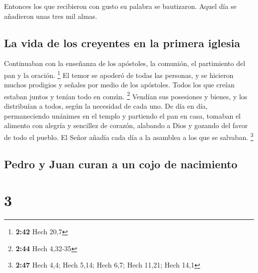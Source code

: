 Entonces los que recibieron con gusto su palabra se
bautizaron. Aquel día se añadieron unas tres mil almas.

\hypertarget{la-vida-de-los-creyentes-en-la-primera-iglesia}{%
\subsection{La vida de los creyentes en la primera
iglesia}\label{la-vida-de-los-creyentes-en-la-primera-iglesia}}

 Continuaban con la enseñanza de los apóstoles, la
comunión, el partimiento del pan y la oración. \footnote{\textbf{2:42}
  Hech 20,7}  El temor se apoderó de todas las personas,
y se hicieron muchos prodigios y señales por medio de los apóstoles.
 Todos los que creían estaban juntos y tenían todo en
común. \footnote{\textbf{2:44} Hech 4,32-35}  Vendían sus
posesiones y bienes, y los distribuían a todos, según la necesidad de
cada uno.  De día en día, permaneciendo unánimes en el
templo y partiendo el pan en casa, tomaban el alimento con alegría y
sencillez de corazón,  alabando a Dios y gozando del
favor de todo el pueblo. El Señor añadía cada día a la asamblea a los
que se salvaban. \footnote{\textbf{2:47} Hech 4,4; Hech 5,14; Hech 6,7;
  Hech 11,21; Hech 14,1}

\hypertarget{pedro-y-juan-curan-a-un-cojo-de-nacimiento}{%
\subsection{Pedro y Juan curan a un cojo de
nacimiento}\label{pedro-y-juan-curan-a-un-cojo-de-nacimiento}}

\hypertarget{section-2}{%
\section{3}\label{section-2}}

